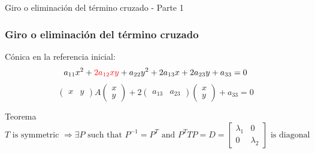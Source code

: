 \documentclass[xcolor={dvipsnames},aspectratio=169,10pt]{beamer}
\begin{document}
\begin{frame}{Giro o eliminación del término cruzado - Parte 1}
  \frametitle{Giro o eliminación del término cruzado}
  Cónica en la referencia inicial:
  \begin{equation*}
    a_{11}x^2 + \textcolor{red}{2a_{12}xy} + a_{22}y^2 + 2a_{13}x + 2a_{23}y + a_{33} = 0
  \end{equation*}
  \begin{equation*}
    \begin{pmatrix} x & y \end{pmatrix} A \begin{pmatrix} x \\ y \end{pmatrix} + 2\begin{pmatrix} a_{13} & a_{23} \end{pmatrix} \begin{pmatrix} x \\ y \end{pmatrix} + a_{33} = 0
  \end{equation*}
  
  \begin{block}{Teorema}
    \begin{equation*}
      T \text{ is symmetric } \Rightarrow \exists P \text{ such that } P^{-1} = P^T \text{ and } P^T T P = D = \begin{bmatrix} \lambda_1 & 0 \\ 0 & \lambda_2 \end{bmatrix} \text{ is diagonal}    
    \end{equation*}
  \end{block}
\end{frame}
\end{document}
